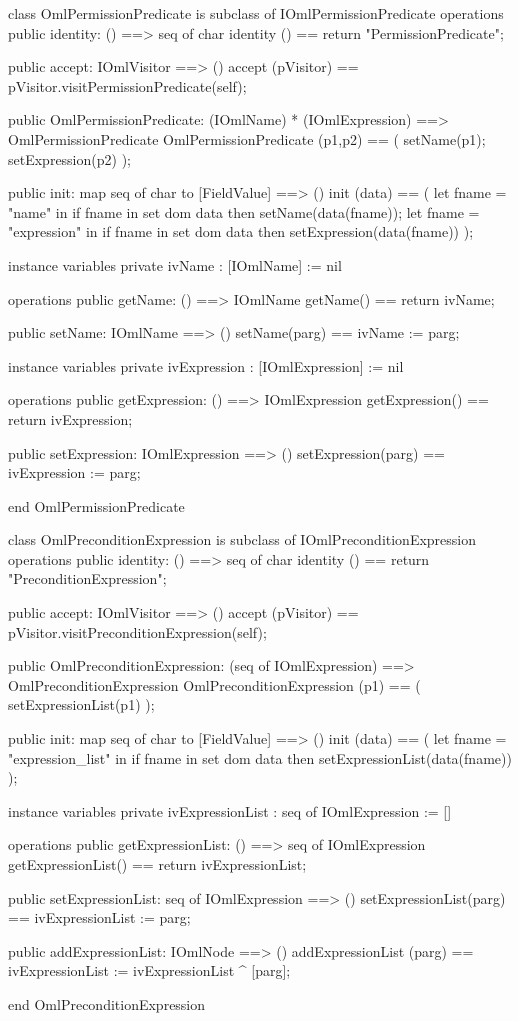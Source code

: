 \begin{vdm_al}
class OmlPermissionPredicate is subclass of IOmlPermissionPredicate
operations
  public identity: () ==> seq of char
  identity () == return "PermissionPredicate";

  public accept: IOmlVisitor ==> ()
  accept (pVisitor) == pVisitor.visitPermissionPredicate(self);

  public OmlPermissionPredicate:
      (IOmlName) *
      (IOmlExpression) ==> OmlPermissionPredicate
  OmlPermissionPredicate (p1,p2) == 
   ( setName(p1);
     setExpression(p2) );

  public init: map seq of char to [FieldValue] ==> ()
  init (data) ==
    ( let fname = "name" in
        if fname in set dom data
        then setName(data(fname));
      let fname = "expression" in
        if fname in set dom data
        then setExpression(data(fname)) );

instance variables
  private ivName : [IOmlName] := nil

operations
  public getName: () ==> IOmlName
  getName() == return ivName;

  public setName: IOmlName ==> ()
  setName(parg) == ivName := parg;

instance variables
  private ivExpression : [IOmlExpression] := nil

operations
  public getExpression: () ==> IOmlExpression
  getExpression() == return ivExpression;

  public setExpression: IOmlExpression ==> ()
  setExpression(parg) == ivExpression := parg;

end OmlPermissionPredicate
\end{vdm_al}

\begin{vdm_al}
class OmlPreconditionExpression is subclass of IOmlPreconditionExpression
operations
  public identity: () ==> seq of char
  identity () == return "PreconditionExpression";

  public accept: IOmlVisitor ==> ()
  accept (pVisitor) == pVisitor.visitPreconditionExpression(self);

  public OmlPreconditionExpression:
      (seq of IOmlExpression) ==> OmlPreconditionExpression
  OmlPreconditionExpression (p1) == 
   ( setExpressionList(p1) );

  public init: map seq of char to [FieldValue] ==> ()
  init (data) ==
    ( let fname = "expression_list" in
        if fname in set dom data
        then setExpressionList(data(fname)) );

instance variables
  private ivExpressionList : seq of IOmlExpression := []

operations
  public getExpressionList: () ==> seq of IOmlExpression
  getExpressionList() == return ivExpressionList;

  public setExpressionList: seq of IOmlExpression ==> ()
  setExpressionList(parg) == ivExpressionList := parg;

  public addExpressionList: IOmlNode ==> ()
  addExpressionList (parg) == ivExpressionList := ivExpressionList ^ [parg];

end OmlPreconditionExpression
\end{vdm_al}

